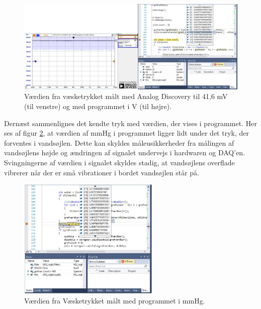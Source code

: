 \begin{figure}[H]
	\centering
	\includegraphics[width=1.1\textwidth]{Figurer/Test/Vandsoejle}
	\caption{Værdien fra væsketrykket målt med Analog Discovery til 41,6 mV (til venstre) og med programmet i V (til højre).}
	\label{fig:Vaesketryk2}
\end{figure}

Dernæst sammenlignes det kendte tryk med værdien, der vises i programmet. Her ses af figur \ref{fig:mmHgtryk}, at værdien af mmHg i programmet ligger lidt under det tryk, der forventes i vandsøjlen. Dette kan skyldes måleusikkerheder fra målingen af vandsøjlens højde og ændringen af signalet undervejs i hardwaren og DAQ’en. Svingningerne af værdien i signalet skyldes stadig, at vandsøjlens overflade vibrerer når der er små vibrationer i bordet vandsøjlen står på.  

\begin{figure}[H]
	\centering
	\includegraphics[width=0.6\textwidth]{Figurer/Test/mmHg}
	\caption{Værdien fra Væsketrykket målt med programmet i mmHg.}
	\label{fig:mmHgtryk}
\end{figure}